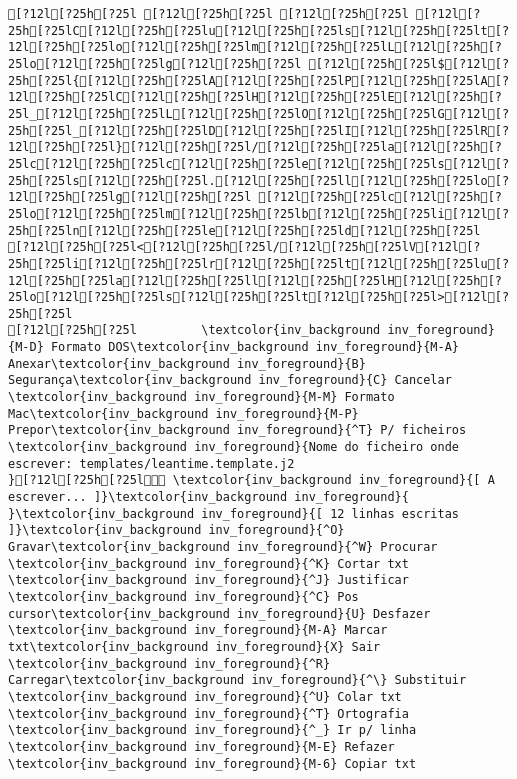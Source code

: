 \documentclass{scrartcl}
\begin{document}
\begin{Verbatim}
[?12l[?25h[?25l [?12l[?25h[?25l [?12l[?25h[?25l [?12l[?25h[?25lC[?12l[?25h[?25lu[?12l[?25h[?25ls[?12l[?25h[?25lt[?12l[?25h[?25lo[?12l[?25h[?25lm[?12l[?25h[?25lL[?12l[?25h[?25lo[?12l[?25h[?25lg[?12l[?25h[?25l [?12l[?25h[?25l$[?12l[?25h[?25l{[?12l[?25h[?25lA[?12l[?25h[?25lP[?12l[?25h[?25lA[?12l[?25h[?25lC[?12l[?25h[?25lH[?12l[?25h[?25lE[?12l[?25h[?25l_[?12l[?25h[?25lL[?12l[?25h[?25lO[?12l[?25h[?25lG[?12l[?25h[?25l_[?12l[?25h[?25lD[?12l[?25h[?25lI[?12l[?25h[?25lR[?12l[?25h[?25l}[?12l[?25h[?25l/[?12l[?25h[?25la[?12l[?25h[?25lc[?12l[?25h[?25lc[?12l[?25h[?25le[?12l[?25h[?25ls[?12l[?25h[?25ls[?12l[?25h[?25l.[?12l[?25h[?25ll[?12l[?25h[?25lo[?12l[?25h[?25lg[?12l[?25h[?25l [?12l[?25h[?25lc[?12l[?25h[?25lo[?12l[?25h[?25lm[?12l[?25h[?25lb[?12l[?25h[?25li[?12l[?25h[?25ln[?12l[?25h[?25le[?12l[?25h[?25ld[?12l[?25h[?25l
[?12l[?25h[?25l<[?12l[?25h[?25l/[?12l[?25h[?25lV[?12l[?25h[?25li[?12l[?25h[?25lr[?12l[?25h[?25lt[?12l[?25h[?25lu[?12l[?25h[?25la[?12l[?25h[?25ll[?12l[?25h[?25lH[?12l[?25h[?25lo[?12l[?25h[?25ls[?12l[?25h[?25lt[?12l[?25h[?25l>[?12l[?25h[?25l
[?12l[?25h[?25l         \textcolor{inv_background inv_foreground}{M-D} Formato DOS\textcolor{inv_background inv_foreground}{M-A} Anexar\textcolor{inv_background inv_foreground}{B} Segurança\textcolor{inv_background inv_foreground}{C} Cancelar           \textcolor{inv_background inv_foreground}{M-M} Formato Mac\textcolor{inv_background inv_foreground}{M-P} Prepor\textcolor{inv_background inv_foreground}{^T} P/ ficheiros
\textcolor{inv_background inv_foreground}{Nome do ficheiro onde escrever: templates/leantime.template.j2                                                                            }[?12l[?25h[?25l \textcolor{inv_background inv_foreground}{[ A escrever... ]}\textcolor{inv_background inv_foreground}{          }\textcolor{inv_background inv_foreground}{[ 12 linhas escritas ]}\textcolor{inv_background inv_foreground}{^O} Gravar\textcolor{inv_background inv_foreground}{^W} Procurar      \textcolor{inv_background inv_foreground}{^K} Cortar txt    \textcolor{inv_background inv_foreground}{^J} Justificar    \textcolor{inv_background inv_foreground}{^C} Pos cursor\textcolor{inv_background inv_foreground}{U} Desfazer     \textcolor{inv_background inv_foreground}{M-A} Marcar txt\textcolor{inv_background inv_foreground}{X} Sair    \textcolor{inv_background inv_foreground}{^R} Carregar\textcolor{inv_background inv_foreground}{^\} Substituir    \textcolor{inv_background inv_foreground}{^U} Colar txt     \textcolor{inv_background inv_foreground}{^T} Ortografia    \textcolor{inv_background inv_foreground}{^_} Ir p/ linha   \textcolor{inv_background inv_foreground}{M-E} Refazer      \textcolor{inv_background inv_foreground}{M-6} Copiar txt

\end{Verbatim}
\end{document}
